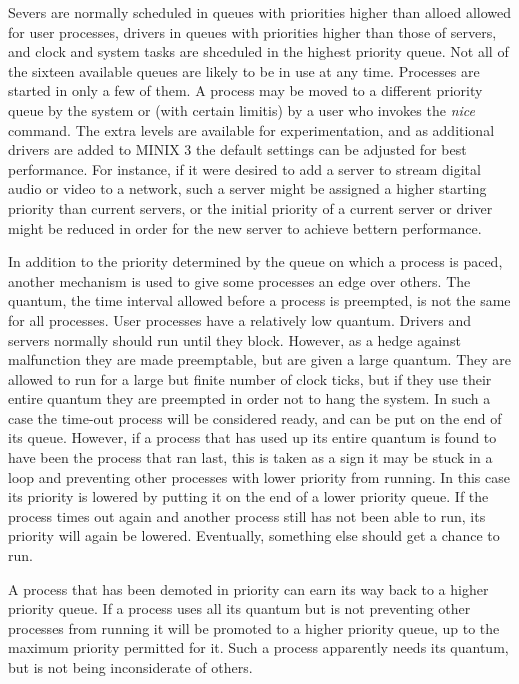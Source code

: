 \documentclass{book}
\newcommand {\sys} [1] {\textsl{#1}}
\begin{document}
Severs are normally scheduled in queues with priorities higher than alloed allowed for user processes,
drivers in queues with priorities higher than those of servers, and clock and system tasks are shceduled in the highest priority queue.
Not all of the sixteen available queues are likely to be in use at any time.
Processes are started in only a few of them.
A process may be moved to a different priority queue by the system or (with certain limitis) by a user who invokes the \sys{nice} command.
The extra levels are available for experimentation, and as additional drivers are added to MINIX 3 
the default settings can be adjusted for best performance.
For instance, if it were desired to add a server to stream digital audio or video to a network,
such a server might be assigned a higher starting priority than current servers,
or the initial priority of a current server or driver might be reduced in order for the new server to achieve bettern performance.

In addition to the priority determined by the queue on which a process is paced, 
another mechanism is used to give some processes an edge over others.
The quantum, the time interval allowed before a process is preempted, is not the same for all processes.
User processes have a relatively low quantum.
Drivers and servers normally should run until they block.
However, as a hedge against malfunction they are made preemptable, but are given a large quantum.
They are allowed to run for a large but finite number of clock ticks,
but if they use their entire quantum they are preempted in order not to hang the system.
In such a case the time-out process will be considered ready, and can be put on the end of its queue.
However, if a process that has used up its entire quantum is found to have been the process that ran last, 
this is taken as a sign it may be stuck in a loop and preventing other processes with lower priority from running.
In this case its priority is lowered by putting it on the end of a lower priority queue.
If the process times out again and another process still has not been able to run, its priority will again be lowered.
Eventually, something else should get a chance to run.

A process that has been demoted in priority can earn its way back to a higher priority queue.
If a process uses all its quantum but is not preventing other processes from running it will be promoted to a higher priority queue,
up to the maximum priority permitted for it.
Such a process apparently needs its quantum, but is not being inconsiderate of others.
\end{document}
